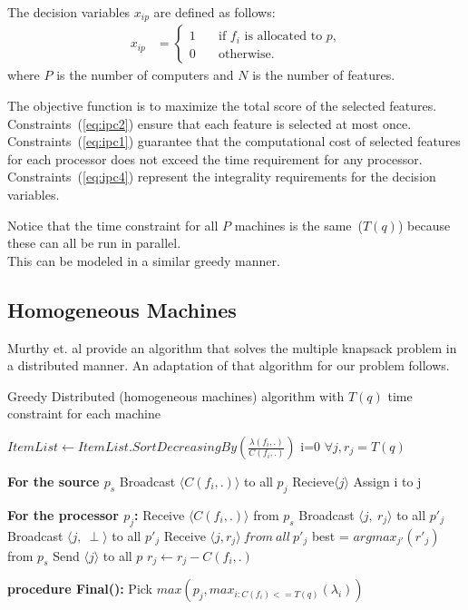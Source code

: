 \documentclass[10pt, conference, compsocconf]{IEEEtran}
\begin{document}
The decision variables $x_{ip}$ are defined as follows:
\begin{align} x_{ip} &=
\begin{cases} 
1 & \quad \text{if $f_i$ is allocated to $p$,}\\
0 & \quad \text{otherwise.}
\end{cases} 
\end{align} 
where $P$ is the number of computers and $N$ is the number of features. 

The objective function is to maximize the total score of the selected features. 
Constraints~(\ref{eq:ipc2}) ensure that each feature is selected at most once. 
Constraints~(\ref{eq:ipc1}) guarantee that 
the computational cost of selected features for each processor does 
not exceed the time requirement for any processor.
Constraints~(\ref{eq:ipc4}) 
represent the integrality requirements for the decision variables. 

Notice that the time constraint for all $P$ machines is the same~($T(q)$) because these can all be run in parallel.\\
This can be modeled in a similar greedy manner.

\subsection{Homogeneous Machines}
Murthy et. al \cite{murthy2017distributed} provide an algorithm that solves the multiple knapsack problem in a distributed manner.
An adaptation of that algorithm for our problem follows.
\begin{algorithm}[H]
 \caption{Greedy Distributed (homogeneous machines) algorithm with $T(q)$ time constraint for each machine }
\label {algo1}
 \begin{algorithmic}[1]
 \renewcommand{\algorithmicrequire}{\textbf{Input:}}
 \renewcommand{\algorithmicensure}{\textbf{Output:}}
  \STATE $ItemList \leftarrow ItemList.SortDecreasingBy(\frac{\lambda(f_i, .)}{C(f_i, .)})$
\STATE i=0
\STATE $\forall j, r_j = T(q)$

\textbf{For the source $p_s$}
  \STATE Broadcast $\langle C(f_i, .)\rangle$ to all $p_j$
\STATE Recieve$ \langle j \rangle$
\STATE Assign i to j
\ENDFOR

\textbf{For the processor $p_j$:}
\STATE Receive $\langle C(f_i, .) \rangle$ from $p_s$
\STATE Broadcast $\langle j,\ r_j \rangle$  to all $ p'_j$
\ELSE 
\STATE Broadcast $\langle j,\ \perp \rangle$  to all $ p'_j$
\ENDIF
\STATE Receive $\langle j, r_j \rangle\ from\ all\ p'_j$
best = $argmax_{j'}(r'_j)$ from $p_s$
\STATE Send $\langle j \rangle$ to all $p$
\STATE $r_j \leftarrow r_j -C(f_i, .)$
\ENDIF

 \textbf{procedure Final():}
\STATE Pick $max(p_j, max_{i:C(f_i)<= T(q)}(\lambda_i) )$
\ENDFOR 
 \end{algorithmic}
 \end{algorithm}
\end{document}
